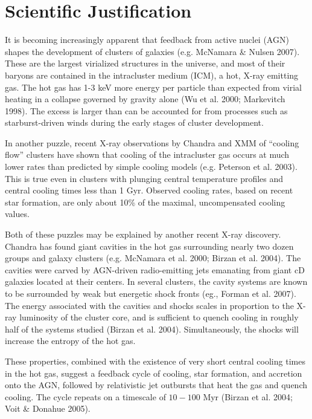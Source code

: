 \documentclass[letterpaper,12pt]{article}
\begin{document}
\section{Scientific Justification}

It is becoming increasingly apparent that feedback from active nuclei
(AGN) shapes the development of clusters of galaxies (e.g. McNamara \& Nulsen 2007).  
These are the largest virialized structures in the universe, and most of their
baryons are contained in the intracluster medium (ICM), a hot, X-ray
emitting gas.  The hot gas has
1-3 keV more energy per particle than expected from virial heating in
a collapse governed by gravity alone (Wu et al. 2000; Markevitch 1998).  
The excess is larger than
can be accounted for from processes such as starburst-driven winds
during the early stages of cluster development.  

In another puzzle, recent X-ray observations by Chandra and XMM of
``cooling flow'' clusters have shown that cooling of the intracluster
gas occurs at much lower rates than predicted by simple cooling models
(e.g. Peterson et al. 2003).  This is true even in clusters with plunging central temperature
profiles and central cooling times less than 1 Gyr.  Observed cooling
rates, based on recent star formation, are only about 10\% of the
maximal, uncompensated cooling values.

Both of these puzzles may be explained by another recent X-ray
discovery.  Chandra has found giant cavities in the hot gas
surrounding nearly two dozen groups and galaxy clusters (e.g. McNamara et al. 2000;
Birzan et al. 2004).  The
cavities were carved by AGN-driven radio-emitting jets emanating from
giant cD galaxies located at their centers.  In several clusters, the
cavity systems are known to be surrounded by weak but energetic shock
fronts (eg., Forman et al. 2007).  The energy associated with the cavities and shocks
scales in proportion to the X-ray luminosity of the cluster core, and
is sufficient to quench cooling in roughly half of the systems studied
(Birzan et al. 2004).  Simultaneously, the shocks will increase the entropy of the hot
gas.  
 
These properties, combined with the existence of very short central
cooling times in the hot gas, suggest a feedback cycle of cooling, star
formation, and accretion onto the AGN, followed by relativistic jet
outbursts that heat the gas and quench cooling.  The cycle repeats on a
timescale of $10-100$ Myr (Birzan et al. 2004; Voit \& Donahue 2005). 
\end{document}
